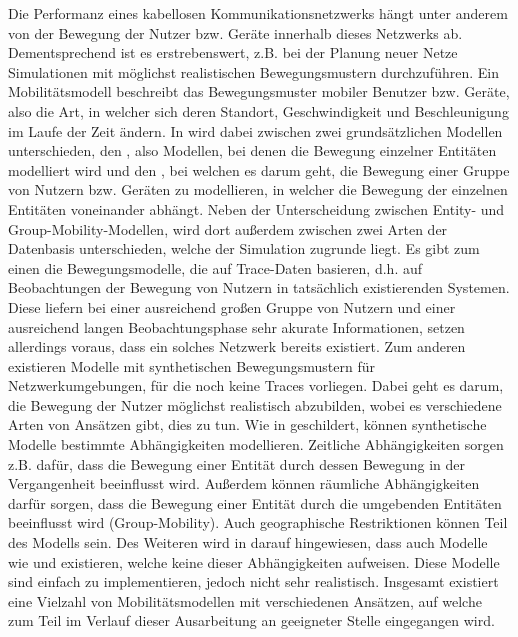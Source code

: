 \documentclass[12pt, a4paper]{article}
\begin{document}
Die Performanz eines kabellosen Kommunikationsnetzwerks hängt unter anderem von der Bewegung 
der Nutzer bzw. Geräte innerhalb dieses Netzwerks ab. Dementsprechend ist es erstrebenswert,
z.B. bei der Planung neuer Netze Simulationen mit möglichst realistischen Bewegungsmustern durchzuführen.
Ein Mobilitätsmodell beschreibt das Bewegungsmuster mobiler Benutzer bzw. Geräte,
also die Art, in welcher sich deren Standort, Geschwindigkeit und Beschleunigung im Laufe der Zeit ändern. \cite{Camp2002}
In \cite{Camp2002} wird dabei zwischen zwei grundsätzlichen Modellen unterschieden, den ,
also Modellen, bei denen die Bewegung einzelner Entitäten modelliert wird und den ,
bei welchen es darum geht, die Bewegung einer Gruppe von Nutzern bzw. Geräten zu modellieren,
in welcher die Bewegung der einzelnen Entitäten voneinander abhängt.\newline
Neben der Unterscheidung zwischen Entity- und Group-Mobility-Modellen, wird dort außerdem zwischen zwei Arten der Datenbasis unterschieden,
welche der Simulation zugrunde liegt. Es gibt zum einen die Bewegungsmodelle, die auf Trace-Daten basieren, d.h. auf Beobachtungen
der Bewegung von Nutzern in tatsächlich existierenden Systemen. Diese liefern bei einer ausreichend großen Gruppe von Nutzern
und einer ausreichend langen Beobachtungsphase sehr akurate Informationen, setzen allerdings voraus, dass ein solches Netzwerk
bereits existiert. \cite{Camp2002} Zum anderen existieren Modelle mit synthetischen Bewegungsmustern für Netzwerkumgebungen, 
für die noch keine Traces vorliegen. Dabei geht es darum, die Bewegung der Nutzer möglichst realistisch abzubilden,
wobei es verschiedene Arten von Ansätzen gibt, dies zu tun.\newline
Wie in \cite{Aschenbruck2011} geschildert, können synthetische Modelle bestimmte Abhängigkeiten modellieren.
Zeitliche Abhängigkeiten sorgen z.B. dafür, dass die Bewegung einer Entität durch dessen Bewegung in der Vergangenheit
beeinflusst wird. Außerdem können räumliche Abhängigkeiten darfür sorgen, dass die Bewegung einer Entität durch die umgebenden 
Entitäten beeinflusst wird (Group-Mobility). Auch geographische Restriktionen können Teil des Modells sein.
Des Weiteren wird in \cite{Aschenbruck2011} darauf hingewiesen, dass auch Modelle wie
 und  existieren, welche keine dieser Abhängigkeiten
aufweisen. Diese Modelle sind einfach zu implementieren, jedoch nicht sehr realistisch.
Insgesamt existiert eine Vielzahl von Mobilitätsmodellen mit verschiedenen Ansätzen,
auf welche zum Teil im Verlauf dieser Ausarbeitung an geeigneter Stelle eingegangen wird.
\end{document}
